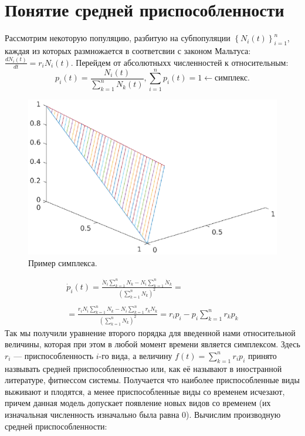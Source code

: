 \section{Понятие средней приспособленности}
Рассмотрим некоторую популяцию, разбитую на субпопуляции $\left\lbrace N_{i}(t) \right\rbrace^n_{i=1}$, каждая из которых размножается в соответсвии с законом Мальтуса: $\frac{dN_{i}(t)}{dt}=r_{i}N_{i}(t)$. Перейдем от абсолютныхх численностей к относительным: 
\begin{equation*}
	p_{i}(t) = \frac{N_{i}(t)}{\sum_{k=1}^{n}N_{k}(t)}, \sum_{i=1}^{n}p_{i}(t)=1 \leftarrow \text{симплекс.}
\end{equation*}
\begin{figure}[H]
	\begin{center}
		\includegraphics[width=0.57\linewidth]{ch11/simplex.eps}
	\end{center}
	\caption{Пример симплекса.}
\end{figure}
\begin{equation*}
\begin{array}{l}
	\dot{p}_{i}(t) = \displaystyle \frac{\dot{N}_{i}\sum_{k=1}^{n}N_{k} - N_{i}\sum_{k=1}^{n}\dot{N}_{k}}{(\sum_{k=1}^{n}N_{k})^2} =\\
	\\
	= \displaystyle\frac{r_{i}N_{i}\sum_{k=1}^{n}N_{k} - N_{i}\sum_{k=1}^{n}r_{k}N_{k}}{(\sum_{k=1}^{n}N_{k})^2} = r_{i}p_{i} - p_i\sum_{k=1}^{n}r_{k}p_{k}
\end{array}
\end{equation*}
Так мы получили уравнение второго порядка для введенной нами относительной величины, которая при этом в любой момент времени является симплексом. Здесь $r_i$ --- приспособленность $i$-го вида, а величину $f(t)=\sum_{k=1}^{n}r_{i}p_{i}$ принято назвывать средней приспособленностью или, как её называют в иностранной литературе, фитнессом системы. Получается что наиболее приспособленные виды выживают и плодятся, а менее приспособленные виды со временем исчезают, причем данная модель допускает появление новых видов со временем (их изначальная численность изначально была равна 0). Вычислим производную средней приспособленности:
